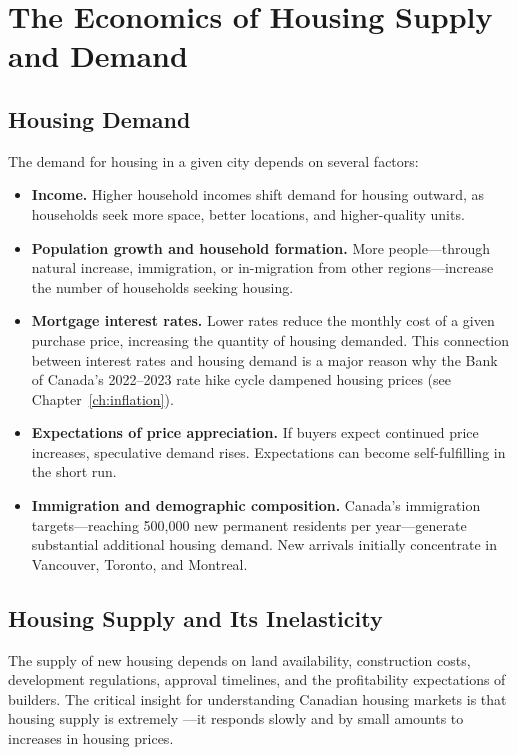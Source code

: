 \section{The Economics of Housing Supply and Demand}

\subsection{Housing Demand}

The demand for housing in a given city depends on several factors:

\begin{itemize}
  \item \textbf{Income.} Higher household incomes shift demand for housing outward, as households seek more space, better locations, and higher-quality units.
  \item \textbf{Population growth and household formation.} More people---through natural increase, immigration, or in-migration from other regions---increase the number of households seeking housing.
  \item \textbf{Mortgage interest rates.} Lower rates reduce the monthly cost of a given purchase price, increasing the quantity of housing demanded. This connection between interest rates and housing demand is a major reason why the Bank of Canada's 2022--2023 rate hike cycle dampened housing prices (see Chapter~\ref{ch:inflation}).
  \item \textbf{Expectations of price appreciation.} If buyers expect continued price increases, speculative demand rises. Expectations can become self-fulfilling in the short run.
  \item \textbf{Immigration and demographic composition.} Canada's immigration targets---reaching 500,000 new permanent residents per year---generate substantial additional housing demand. New arrivals initially concentrate in Vancouver, Toronto, and Montreal.
\end{itemize}

\subsection{Housing Supply and Its Inelasticity}

The supply of new housing depends on land availability, construction costs, development regulations, approval timelines, and the profitability expectations of builders. The critical insight for understanding Canadian housing markets is that housing supply is extremely ---it responds slowly and by small amounts to increases in housing prices.


